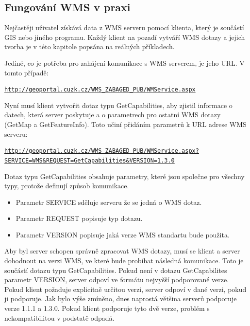 \documentclass[a4paper,12pt]{article}
\begin{document}
\subsection{Fungování WMS v praxi}

 
Nejčastěji uživatel získává data z WMS serveru pomocí klienta, který je součástí GIS nebo jiného programu. Každý klient na pozadí vytváří WMS dotazy a jejich 
tvorba je v této kapitole popsána na reálných příkladech. 


\newpage
Jediné, co je potřeba pro zahájení komunikace s WMS serverem, je jeho URL. V tomto případě:
\begin{alltt}\footnotesize
\url{http://geoportal.cuzk.cz/WMS_ZABAGED_PUB/WMService.aspx}
\end{alltt}

Nyní musí klient vytvořit dotaz typu GetCapabilities, aby zjistil informace o datech, která server poskytuje a o parametrech pro ostatní WMS dotazy (GetMap a GetFeatureInfo).
Toto učiní přidáním parametrů k URL adrese WMS serveru:

\newcommand{\CUZKgetCap}{http://geoportal.cuzk.cz/WMS_ZABAGED_PUB/WMService.aspx?SERVICE=WMS&REQUEST=GetCapabilities&VERSION=1.3.0}
\begin{alltt}\footnotesize
\href{\CUZKgetCap}{http://geoportal.cuzk.cz/WMS_ZABAGED_PUB/WMService.aspx?}
\href{\CUZKgetCap}{SERVICE=WMS&REQUEST=GetCapabilities&VERSION=1.3.0}
\end{alltt}

 Dotaz typu GetCapabilities obsahuje parametry, které jsou společne pro všechny typy, protože definují způsob komunikace.
\begin{itemize}
  \item Parametr SERVICE sděluje serveru že se jedná o WMS dotaz. 
  \item Parametr REQUEST popisuje typ dotazu. 
  \item Parametr VERSION popisuje jaká verze WMS standartu bude použita.
\end{itemize}

Aby byl server schopen správně zpracovat WMS dotazy, musí se klient a server dohodnout na verzi WMS, ve které bude probíhat následná komunikace.
Toto je součástí dotazu typu GetCapabilities. Pokud není v dotazu GetCapabilites parametr VERSION, server odpoví ve formátu nejvyšší podporované verze. 
Pokud klient požaduje explicitně určitou verzi, server odpoví v dané verzi, pokud ji podporuje. Jak bylo výše zmíněno, dnes naprostá většina serverů podporuje 
verze 1.1.1 a 1.3.0. Pokud klient podporuje tyto dvě verze, problém s nekompatibilitou v podstatě odpadá.
\end{document}
